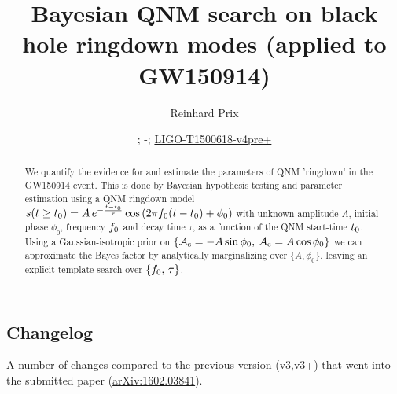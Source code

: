 \documentclass[aps,prd,onecolumn,notitlepage,nofootinbib,superscriptaddress,altaffilletter,floatfix]{revtex4-1}
\newcommand{\dcc}{LIGO-T1500618-v4pre+}
\begin{document}
\title{Bayesian QNM search on black hole ringdown modes (applied to GW150914)}


\author{Reinhard Prix}
\date{\commitDATE; \commitIDshort-\commitSTATUS; \href{https://dcc.ligo.org/LIGO-T1500618}{\dcc}}


\begin{abstract}
  We quantify the evidence for and estimate the parameters of QNM 'ringdown' in the GW150914 event.
  This is done by Bayesian hypothesis testing and parameter estimation using a QNM ringdown model
  $s(t\ge t_0) = A\,e^{-\frac{t-t_0}{\tau}}\cos\left(2\pi f_0 (t-t_0) + \phi_0\right)$ with unknown amplitude $A$, initial phase $\phi_0$,
  frequency $f_0$ and decay time $\tau$, as a function of the QNM start-time $t_0$.
  Using a Gaussian-isotropic prior on $\{{\mathcal A}_{\mathrm{s}}=-A\sin\phi_0,\,{\mathcal A}_{\mathrm{c}}=A\cos\phi_0\}$ we can approximate the Bayes factor by analytically marginalizing over
  $\{A,\phi_0\}$, leaving an explicit template search over $\{f_0,\,\tau\}$.
\end{abstract}

\maketitle

\subsection{Changelog}
\label{sec:changelog}

A number of changes compared to the previous version (v3,v3+) that went into the submitted paper (\href{http://arxiv.org/abs/1602.03841}{arXiv:1602.03841}).
\end{document}
